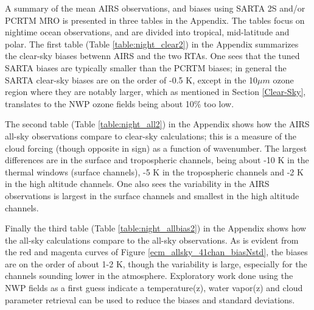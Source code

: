 \documentclass[agupp]{aguplus}              %
\newcommand{\um}{$\mu m$\xspace}
\begin{document}
\begin{article}
A summary of the mean AIRS observations, and biases using SARTA 2S
and/or PCRTM MRO is presented in three tables in the Appendix. The
tables focus on nightime ocean observations, and are divided into
tropical, mid-latitude and polar. The first table (Table
\ref{table:night_clear2}) in the Appendix summarizes the clear-sky
biases betwenn AIRS and the two RTAs. One sees that the tuned SARTA
biases are typically smaller than the PCRTM biases; in general the
SARTA clear-sky biases are on the order of -0.5 K, except in the 10\um
ozone region where they are notably larger, which as mentioned in
Section \ref{Clear-Sky}, translates to the NWP ozone fields being
about 10\% too low.

The second table (Table \ref{table:night_all2}) in the Appendix shows
how the AIRS all-sky observations compare to clear-sky calculations;
this is a measure of the cloud forcing (though opposite in sign) as a
function of wavenumber. The largest differences are in the surface and
tropospheric channels, being about -10 K in the thermal windows
(surface channels), -5 K in the tropospheric channels and -2 K in the
high altitude channels. One also sees the variability in the AIRS
observations is largest in the surface channels and smallest in the
high altitude channels.

Finally the third table (Table \ref{table:night_allbias2}) in the Appendix shows how the all-sky
calculations compare to the all-sky observations. As is evident from
the red and magenta curves of Figure \ref{ecm_allsky_41chan_biasNstd},
the biases are on the order of about 1-2 K, though the variability is
large, especially for the channels sounding lower in the atmosphere.
Exploratory work done using the NWP fields as a first guess indicate a
temperature(z), water vapor(z) and cloud parameter retrieval can be
used to reduce the biases and standard deviations.


\end{article}
\end{document}
